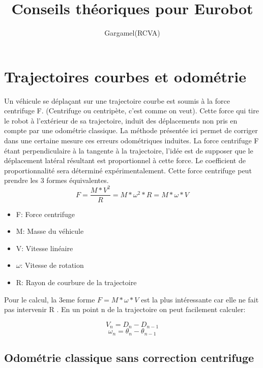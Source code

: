 \documentclass[a4paper]{report}
\author{Gargamel(RCVA)}
\title{Conseils théoriques pour Eurobot}
\begin{document}

\maketitle %
\tableofcontents %

\chapter{Trajectoires courbes et odométrie}
Un véhicule se déplaçant sur une trajectoire courbe est soumis à la force centrifuge F. (Centrifuge ou centripète, c'est comme on veut).
Cette force qui tire le robot à l'extérieur de sa trajectoire, induit des déplacements non pris en compte par une odométrie classique.
La méthode présentée ici permet de corriger dans une certaine mesure ces erreurs odométriques induites.
La force centrifuge F étant perpendiculaire à la tangente à la trajectoire, l'idée est de supposer que le déplacement latéral résultant est proportionnel à cette force. Le coefficient de proportionnalité sera déterminé expérimentalement.
Cette force centrifuge peut prendre les 3 formes équivalentes.
\begin{equation}
F= \frac{M*V^2}{R} = M*\omega^2*R = M*\omega*V
\end{equation}

\begin{itemize}
\item F:  Force centrifuge
\item M: Masse du véhicule
\item V:  Vitesse linéaire
\item $\omega$: Vitesse de rotation
\item R:  Rayon de courbure de la trajectoire
\end{itemize}


Pour le calcul, la 3eme forme $F=M*\omega*V$ est la plus intéressante car elle ne fait pas intervenir R .
En un point n de la trajectoire on peut facilement calculer:

\begin{equation}
V_n= D_n - D_{n-1}
\end{equation}
\begin{equation}
\omega_n= \theta_n - \theta_{n-1}
\end{equation}

\section{Odométrie classique sans correction centrifuge}
\end{document}
